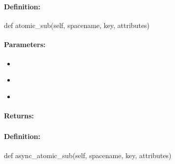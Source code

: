 \subsubsection{}
\label{api:python:atomic_sub}


\paragraph{Definition:}
\begin{pythoncode}
def atomic_sub(self, spacename, key, attributes)
\end{pythoncode}

\paragraph{Parameters:}
\begin{itemize}[noitemsep]
\item {}\\

\item {}\\

\item {}\\

\end{itemize}

\paragraph{Returns:}


\pagebreak
\subsubsection{}
\label{api:python:async_atomic_sub}


\paragraph{Definition:}
\begin{pythoncode}
def async_atomic_sub(self, spacename, key, attributes)
\end{pythoncode}

